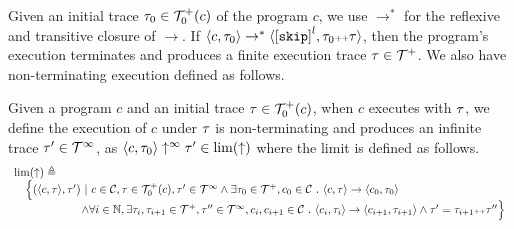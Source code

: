 Given an initial trace $\mathtt{\tau}_0 \in \mathcal{T}^{+}_0(c)$ of the program $c$,
we use $\to^*$ for the reflexive and transitive closure of $\to$. 
If $\config{c, \trace_0} \rightarrow^{*} \config{\clabel{\eskip}^l, \trace_0 \tracecat \trace}$,
then the program's execution terminates and produces a finite execution trace $\mathtt{\tau} \in \mathcal{T}^{+}$. We also have non-terminating execution defined as follows.
\\
\begin{defn}
  \label{def:non-terminating}
  Given a program $c$ and an initial trace $\mathtt{\tau} \in \mathcal{T}^{+}_0(c)$,
  when $c$ executes with $\mathtt{\tau}$,  we define the execution of $c$ under $\mathtt{\tau}$ is non-terminating and produces an infinite trace $\mathtt{\tau}' \in \mathcal{T}^{\infty}$, as 
  $\langle c, \mathtt{\tau}_0 \rangle \uparrow^{\infty} \mathtt{\tau}' \in \lim(\uparrow)$
  where the limit is defined as follows.
  \[
    \begin{array}{l}
      \lim(\uparrow) 
      \triangleq 
    \\ \quad
    \Big\{
      (\langle c, \mathtt{\tau} \rangle, \mathtt{\tau}') ~\vert~ 
      c\in \mathcal{C}, \mathtt{\tau} \in \mathcal{T}^{+}_0(c),
      \mathtt{\tau}' \in \mathcal{T}^{\infty} 
      \land \exists \mathtt{\tau}_0 \in \mathcal{T}^{+}, c_0 \in \mathcal{C} ~.~ 
      \langle c, \mathtt{\tau} \rangle \to \langle c_0, \mathtt{\tau}_0 \rangle
      \\ \qquad \qquad \qquad 
      \land \forall i \in \mathbb{N}, \exists \mathtt{\tau}_i, \mathtt{\tau}_{i + 1} \in \mathcal{T}^{+}, \mathtt{\tau}'' \in \mathcal{T}^{\infty}, c_i, c_{i + 1} \in \mathcal{C} ~.~ 
      \langle c_i, \mathtt{\tau}_i \rangle \to \langle c_{i + 1}, \mathtt{\tau}_{i + 1} \rangle 
      \land  \mathtt{\tau}' = \mathtt{\tau}_{i + 1} {\scriptscriptstyle ++} \mathtt{\tau}''
    \Big\}
    \end{array}
  \]
\end{defn}
%
